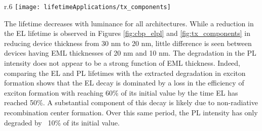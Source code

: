 \documentclass[../thesis.tex]{subfiles}
\begin{document}
\begin{wrapfigure}{r}{.6\textwidth}
\centering
\texttt{[image: lifetimeApplications/tx\_components]}
\caption{Extracted lifetimes for all 3 architectures as a function of luminance.}
\label{fig:tx_components}
\end{wrapfigure}

The lifetime decreases with luminance for all architectures.  
While a reduction in the EL lifetime is observed in Figures \ref{fig:cbp_elpl} and \ref{fig:tx_components} in reducing device thickness from 30 nm to 20 nm, little difference is seen between devices having EML thicknesses of 20 nm and 10 nm.  
The degradation in the PL intensity does not appear to be a strong function of EML thickness.  
Indeed, comparing the EL and PL lifetimes with the extracted degradation in exciton formation shows that the EL decay is dominated by a loss in the efficiency of exciton formation with \ef reaching 60\% of its initial value by the time EL has reached 50\%.  
A substantial component of this decay is likely due to non-radiative recombination center formation.\supercite{Kondakov2003,Kondakov2007d}
Over this same period, the PL intensity has only degraded by ~10\% of its initial value.
\end{document}
